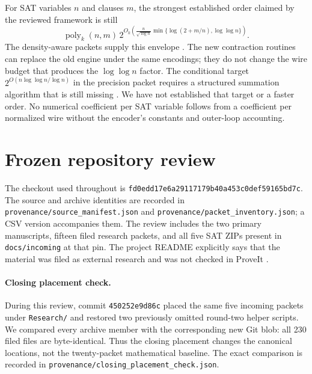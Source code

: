 \documentclass[11pt,letterpaper]{article}
\theoremstyle{remark}\newtheorem{remark}[theorem]{Remark}
\newcommand{\poly}{\operatorname{poly}}
\begin{document}
For SAT variables $n$ and clauses $m$, the strongest established order
claimed by the reviewed framework is still
\begin{equation}\label{eq:sat-envelope}
 \poly_k(n,m)\,
 2^{O_k\!\left(\frac{n}{\sqrt{\log n}}
       \min\{\log(2+m/n),\log\log n\}\right)}.
\end{equation}
The density-aware packets supply this envelope \cite{density}. The new
contraction routines can replace the old engine under the same encodings;
they do not change the wire budget that produces the $\log\log n$ factor.
The conditional target $2^{O(n\log\log n/\log n)}$ in the precision packet
requires a structured summation algorithm that is still missing
\cite{precision}. We have not established that target or a faster order.
No numerical coefficient per SAT variable follows from a coefficient per
normalized wire without the encoder's constants and outer-loop accounting.

\section{Frozen repository review}
\label{sec:review}

The checkout used throughout is
\texttt{fd0edd17e6a29117179b40a453c0def59165bd7c}.
The source and archive identities are recorded in
\texttt{provenance/source\_manifest.json} and
\texttt{provenance/packet\_inventory.json}; a CSV version accompanies them.
The review includes the two primary manuscripts, fifteen filed research
packets, and all five SAT ZIPs present in \texttt{docs/incoming} at that pin.
The project README explicitly says that the material was filed as external
research and was not checked in ProveIt \cite{index}.

\paragraph{Closing placement check.}
During this review, commit \texttt{450252e9d86c} placed the same five
incoming packets under \texttt{Research/} and restored two previously
omitted round-two helper scripts. We compared every archive member with
the corresponding new Git blob: all 230 filed files are byte-identical.
Thus the closing placement changes the canonical locations, not the
twenty-packet mathematical baseline. The exact comparison is recorded in
\texttt{provenance/closing\_placement\_check.json}.
\end{document}

